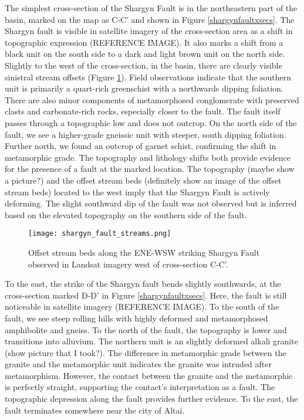 The simplest cross-section of the Shargyn Fault is in the northeastern part of the basin, marked on the map as C-C' and shown in Figure \ref{shargynfaultxsecs}. The Shargyn fault is visible in satellite imagery of the cross-section area as a shift in topographic expression (REFERENCE IMAGE). It also marks a shift from a black unit on the south side to a dark and light brown unit on the north side. Slightly to the west of the cross-section, in the basin, there are clearly visible sinistral stream offsets (Figure \ref{shargynoffsetstreams}). Field observations indicate that the southern unit is primarily a quart-rich greenschist with a northwards dipping foliation. There are also minor components of metamorphosed conglomerate with preserved clasts and carbonate-rich rocks, especially closer to the fault.  The fault itself passes through a topographic low and does not outcrop. On the north side of the fault, we see a higher-grade gneissic unit with steeper, south dipping foliation. Further north, we found an outcrop of garnet schist, confirming the shift in metamorphic grade. The topography and lithology shifts both provide evidence for the presence of a fault at the marked location. The topography (maybe show a picture?) and the offset stream beds (definitely show an image of the offset stream beds) located to the west imply that the Shargyn Fault is actively deforming. The slight southward dip of the fault was not observed but is inferred based on the elevated topography on the southern side of the fault. 

\begin{figure}[h!]
  \centering
  \texttt{[image: shargyn\_fault\_streams.png]}
  \caption{Offset stream beds along the ENE-WSW striking Shargyn Fault observed in Landsat imagery west of cross-section C-C'.}
  \label{shargynoffsetstreams}
\end{figure}

To the east, the strike of the Shargyn fault bends slightly southwards, at the cross-section marked D-D' in Figure \ref{shargynfaultxsecs}. Here, the fault is still noticeable in satellite imagery (REFERENCE IMAGE). To the south of the fault, we see steep rolling hills with highly deformed and metamorphosed amphibolite and gneiss. To the north of the fault, the topography is lower and transitions into alluvium. The northern unit is an slightly deformed alkali granite (show picture that I took?). The difference in metamorphic grade between the granite and the metamorphic unit indicates the granite was intruded after metamorphism. However, the contact between the granite and the metamorphic is perfectly straight, supporting the contact's interpretation as a fault. The topographic depression along the fault provides further evidence. To the east, the fault terminates somewhere near the city of Altai. 

